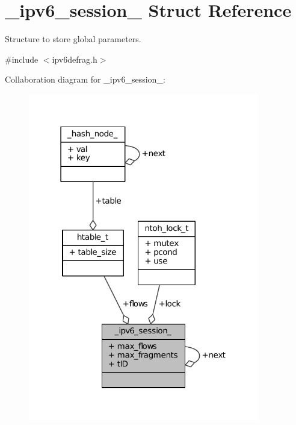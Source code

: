 \hypertarget{struct__ipv6__session__}{\section{\-\_\-ipv6\-\_\-session\-\_\- Struct Reference}
\label{struct__ipv6__session__}
}


Structure to store global parameters.  




{\ttfamily \#include $<$ipv6defrag.\-h$>$}



Collaboration diagram for \-\_\-ipv6\-\_\-session\-\_\-\-:
\nopagebreak
\begin{figure}[H]
\begin{center}
\leavevmode
\includegraphics[width=286pt]{struct__ipv6__session____coll__graph}
\end{center}
\end{figure}
